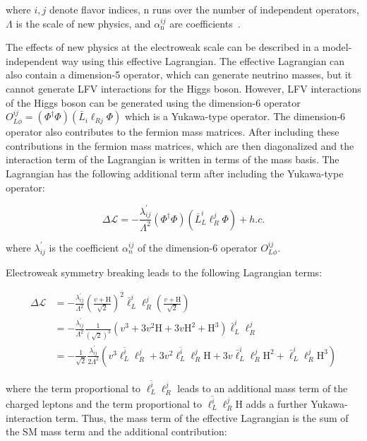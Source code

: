 where $i, j$ denote flavor indices, n runs over the number of independent operators, $\Lambda$ is the scale of new physics, and $\alpha_{\text{n}}^{i j}$ are coefficients~\cite{DiazCruz:1999xe}.

The effects of new physics at the electroweak scale can be described in a model-independent way using this effective Lagrangian. The effective Lagrangian can also contain a dimension-5 operator, which can generate neutrino masses, but it cannot generate LFV interactions for the Higgs boson. However, LFV interactions of the Higgs boson can be generated using the dimension-6 operator $O_{L \phi}^{i j}=(\Phi^{\dagger} \Phi)(\bar{L}_{i} \ell_{R j} \Phi)$ which is a Yukawa-type operator. The dimension-6 operator also contributes to the fermion mass matrices. After including these contributions in the fermion mass matrices, which are then diagonalized and the interaction term of the Lagrangian is written in terms of the mass basis. The Lagrangian has the following additional term after including the Yukawa-type operator:

\begin{equation}
  \Delta \mathcal{L}=-\frac{\lambda_{i j}^{\prime}}{\Lambda^2}(\Phi^{\dagger} \Phi)(\bar{L}_{L}^{i} \ell_{R}^{j} \Phi)+h.c.
\end{equation}

where $\lambda_{i j}^{\prime}$ is the coefficient $\alpha_{n}^{i j}$ of the dimension-6 operator $O_{L \phi}^{i j}$.

Electroweak symmetry breaking leads to the following Lagrangian terms:

\begin{equation}
  \begin{aligned}
    \Delta \mathcal{L} &=-\frac{\lambda_{i j}^{\prime}}{\Lambda^2}(\frac{v+\text{H}}{\sqrt{2}})^2 \bar{\ell}_{L}^{i} \ell_{R}^{j}(\frac{v+\text{H}}{\sqrt{2}}) \\
    &=-\frac{\lambda_{i j}^{\prime}}{\Lambda^2} \frac{1}{(\sqrt{2})^{3}}(v^{3}+3 v^2 \text{H} + 3 v \text{H}^2 + \text{H}^{3}) \bar{\ell}_{L}^{i} \ell_{R}^{j} \\
    &=-\frac{1}{\sqrt{2}} \frac{\lambda_{i j}^{\prime}}{2 \Lambda^2}(v^{3} \overline{\ell_{L}^{i}} \ell_{R}^{j}+3 v^2 \overline{\ell_{L}^{i}} \ell_{R}^{j} \text{H} + 3 v \bar{\ell}_{L}^{i} \ell_{R}^{j} \text{H}^2+\bar{\ell}_{L}^{i} \ell_{R}^{j} \text{H}^{3})
  \end{aligned}
\end{equation}

where the term proportional to $\overline{\ell_{L}^{i}} \ell_{R}^{j}$ leads to an additional mass term of the charged leptons and the term proportional to $\overline{\ell_{L}^{i}} \ell_{R}^{j} \text{H}$ adds a further Yukawa-interaction term. Thus, the mass term of the effective Lagrangian is the sum of the SM mass term and the additional contribution:

